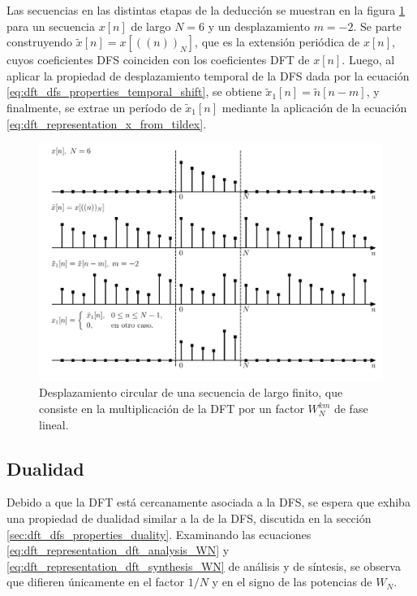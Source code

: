 \documentclass[a4paper]{report}
\begin{document}
Las secuencias en las distintas etapas de la deducción se muestran en la figura \ref{fig:dft_properties_circular_shift} para un secuencia \(x[n]\) de largo \(N=6\) y un desplazamiento \(m=-2\). Se parte construyendo \(\tilde{x}[n]=x[((n))_N]\), que es la extensión periódica de \(x[n]\), cuyos coeficientes DFS coinciden con los coeficientes DFT de \(x[n]\). Luego, al aplicar la propiedad de desplazamiento temporal de la DFS dada por la ecuación \ref{eq:dft_dfs_properties_temporal_shift}, se obtiene \(\tilde{x}_1[n]=\tilde{n}[n-m]\), y finalmente, se extrae un período de \(\tilde{x}_1[n]\) mediante la aplicación de la ecuación \ref{eq:dft_representation_x_from_tildex}.
\begin{figure}[!htb]
 \begin{center}
 \includegraphics[width=\textwidth]{figuras/dft_properties_circular_shift.pdf}
 \caption{\label{fig:dft_properties_circular_shift} Desplazamiento circular de una secuencia de largo finito, que consiste en la multiplicación de la DFT por un factor \(W_N^{km}\) de fase lineal.}
 \end{center}
\end{figure}

\subsection{Dualidad}

Debido a que la DFT está cercanamente asociada a la DFS, se espera que exhiba una propiedad de dualidad similar a la de la DFS, discutida en la sección \ref{sec:dft_dfs_properties_duality}. Examinando las ecuaciones \ref{eq:dft_representation_dft_analysis_WN} y \ref{eq:dft_representation_dft_synthesis_WN} de análisis y de síntesis, se observa que difieren únicamente en el factor \(1/N\) y en el signo de las potencias de \(W_N\).
\end{document}

